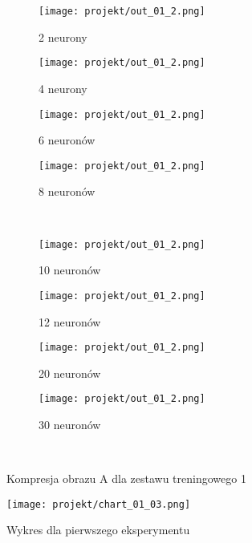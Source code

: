\documentclass[12pt]{article}
\begin{document}
\begin{figure}[H]
\centering
 \begin{subfigure}[b]{.24\linewidth}
   \centering
   \texttt{[image: projekt/out\_01\_2.png]}
   \caption{2 neurony}\label{fig:a}
 \end{subfigure}%
  \begin{subfigure}[b]{.24\linewidth}
   \centering
   \texttt{[image: projekt/out\_01\_2.png]}
   \caption{4 neurony}\label{fig:b}
 \end{subfigure}%
  \begin{subfigure}[b]{.24\linewidth}
   \centering
   \texttt{[image: projekt/out\_01\_2.png]}
   \caption{6 neuronów}\label{fig:c}
 \end{subfigure}%
  \begin{subfigure}[b]{.24\linewidth}
   \centering
   \texttt{[image: projekt/out\_01\_2.png]}
   \caption{8 neuronów}\label{fig:d}
 \end{subfigure}\\%
 \begin{subfigure}[b]{.24\linewidth}
   \centering
   \texttt{[image: projekt/out\_01\_2.png]}
   \caption{10 neuronów}\label{fig:e}
 \end{subfigure}%
  \begin{subfigure}[b]{.24\linewidth}
   \centering
   \texttt{[image: projekt/out\_01\_2.png]}
   \caption{12 neuronów}\label{fig:f}
 \end{subfigure}%
  \begin{subfigure}[b]{.24\linewidth}
   \centering
   \texttt{[image: projekt/out\_01\_2.png]}
   \caption{20 neuronów}\label{fig:g}
 \end{subfigure}%
  \begin{subfigure}[b]{.24\linewidth}
   \centering
   \texttt{[image: projekt/out\_01\_2.png]}
   \caption{30 neuronów}\label{fig:h}
 \end{subfigure}\\%
 \caption{Kompresja obrazu A dla zestawu treningowego 1} \label{kompresja}
\end{figure}

\begin{figure}[H]
 \centering
 \texttt{[image: projekt/chart\_01\_03.png]}
 \caption{Wykres dla pierwszego eksperymentu}
 \label{chart_01}
\end{figure}
\end{document}
